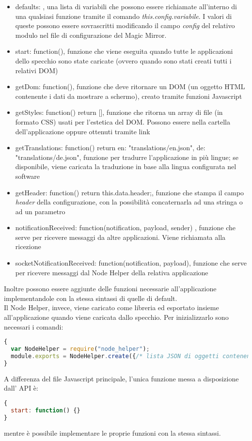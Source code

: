 \begin{itemize}
\item defaults: {}, una lista di variabili che possono essere richiamate all'interno di una qualsiasi funzione tramite il comando \textit{this.config.variabile}.
I valori di queste possono essere sovrascritti modificando il campo \textit{config} del relativo modulo nel file di configurazione del Magic Mirror.
\item start: function(){}, funzione che viene eseguita quando tutte le applicazioni dello specchio sono state caricate (ovvero quando sono stati creati tutti i relativi DOM)
\item getDom: function(){}, funzione che deve ritornare un DOM (un oggetto HTML contenente i dati da mostrare a schermo), creato tramite funzioni Javascript
\item getStyles: function() { return []}, funzione che ritorna un array di file (in formato CSS) usati per l'estetica del DOM. Possono essere nella cartella dell'applicazione
oppure ottenuti tramite link
\item getTranslations: function() {	return {en: "translations/en.json", de: "translations/de.json"}}, funzione per tradurre l'applicazione in pi\`u lingue;
se disponibile, viene caricata la traduzione in base alla lingua configurata nel software
\item getHeader: function() {	return this.data.header;}, funzione che stampa il campo \textit{header} della configurazione, con la possibilit\`a concaternarla
ad una stringa o ad un parametro
\item notificationReceived: function(notification, payload, sender) {}, funzione che serve per ricevere messaggi da altre applicazioni. Viene richiamata alla ricezione
\item socketNotificationReceived: function(notification, payload){}, funzione che serve per ricevere messaggi dal Node Helper della relativa applicazione\\[1\baselineskip]
\end{itemize}
Inoltre possono essere aggiunte delle funzioni necessarie all'applicazione implementandole con la stessa sintassi di quelle di default.
\\[1\baselineskip]
Il Node Helper, invece, viene caricato come libreria ed esportato insieme all'applicazione quando viene caricata dallo specchio. Per inizializzarlo sono
necessari i comandi:
\begin{lstlisting}[language=JavaScript]
{
  var NodeHelper = require("node_helper");
  module.exports = NodeHelper.create({/* lista JSON di oggetti contenenti funzioni*/});
}
\end{lstlisting}
A differenza del file Javascript principale, l'unica funzione messa a disposizione dall' API \`e:
\begin{lstlisting}[language=JavaScript]
{
  start: function() {}
}
\end{lstlisting}
mentre \`e possibile implementare le proprie funzioni con la stessa sintassi.
\fi
